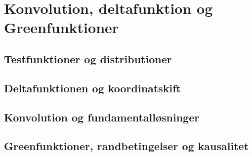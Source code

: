 \chapter{Konvolution, deltafunktion og Greenfunktioner}
\section{Testfunktioner og distributioner}
\leavevmode\par

\section{Deltafunktionen og koordinatskift}
\leavevmode\par

\section{Konvolution og fundamentalløsninger}
\leavevmode\par

\section{Greenfunktioner, randbetingelser og kausalitet}
\leavevmode\par
